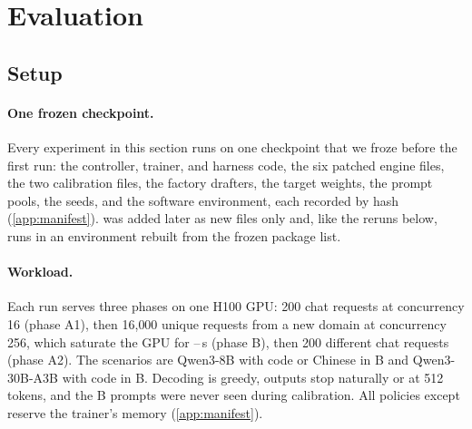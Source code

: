 \section{Evaluation}\label{sec:evaluation}

\subsection{Setup}\label{sec:setup}

\paragraph{One frozen checkpoint.} Every experiment in this section runs on one checkpoint that we froze before the first run: the controller, trainer, and harness code, the six patched engine files, the two calibration files, the factory drafters, the target weights, the prompt pools, the seeds, and the software environment, each recorded by hash (\cref{app:manifest}).  was added later as new files only and, like the reruns below, runs in an environment rebuilt from the frozen package list.

\paragraph{Workload.} Each run serves three phases on one H100 GPU: 200 chat requests at concurrency 16 (phase A1), then 16{,}000 unique requests from a new domain at concurrency 256, which saturate the GPU for --\,s (phase B), then 200 different chat requests (phase A2). The scenarios are Qwen3-8B with code or Chinese in B and Qwen3-30B-A3B with code in B. Decoding is greedy, outputs stop naturally or at 512 tokens, and the B prompts were never seen during calibration. All policies except  reserve the trainer's memory (\cref{app:manifest}).

